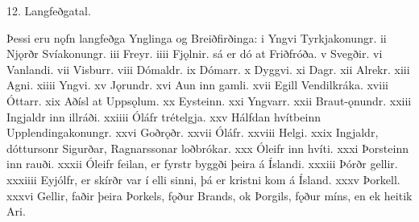 12. Langfeðgatal.

Þessi eru nǫfn langfeðga Ynglinga og Breiðfirðinga:
i Yngvi Tyrkjakonungr. ii Njǫrðr Svíakonungr. iii Freyr. iiii Fjǫlnir. sá er dó at Friðfróða. v Svegðir. vi Vanlandi. vii Visburr. viii Dómaldr. ix Dómarr. x Dyggvi. xi Dagr. xii Alrekr. xiii Agni. xiiii Yngvi. xv Jǫrundr. xvi Aun inn gamli. xvii Egill Vendilkráka. xviii Óttarr. xix Aðísl at Uppsǫlum. xx Eysteinn. xxi Yngvarr. xxii Braut-ǫnundr. xxiii Ingjaldr inn illráði. xxiiii Óláfr trételgja. xxv Hálfdan hvítbeinn Upplendingakonungr. xxvi Goðrǫðr. xxvii Óláfr. xxviii Helgi. xxix Ingjaldr, dóttursonr Sigurðar, Ragnarssonar loðbrókar. xxx Óleifr inn hvíti. xxxi Þorsteinn inn rauði. xxxii Óleifr feilan, er fyrstr byggði þeira á Íslandi. xxxiii Þórðr gellir. xxxiiii Eyjólfr, er skírðr var í elli sinni, þá er kristni kom á Ísland. xxxv Þorkell. xxxvi Gellir, faðir þeira Þorkels, fǫður Brands, ok Þorgils, fǫður míns, en ek heitik Ari.